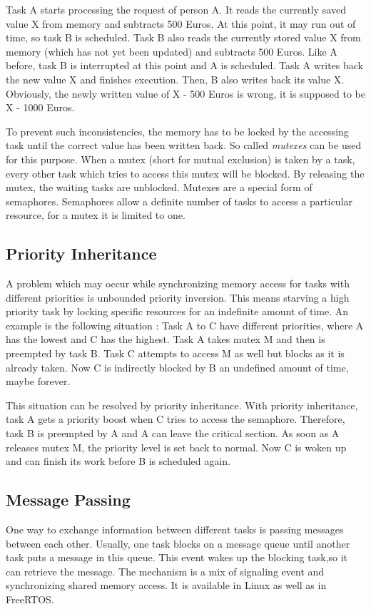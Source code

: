 Task A starts processing the request of person A.
It reads the currently saved value X from memory and subtracts 500 Euros.
At this point, it may run out of time, so task B is scheduled.
Task B also reads the currently stored value X from memory (which has not yet been updated) and subtracts 500 Euros.
Like A before, task B is interrupted at this point and A is scheduled.
Task A writes back the new value X and finishes execution.
Then, B also writes back its value X.
Obviously, the newly written value of X - 500 Euros is wrong, it is supposed to be X - 1000 Euros. 
\par
To prevent such inconsistencies, the memory has to be locked by the accessing task until the correct value has been written back.
So called \textit{mutexes} can be used for this purpose.
When a mutex (short for mutual exclusion) is taken by a task, every other task which tries to access this mutex will be blocked.
By releasing the mutex, the waiting tasks are unblocked.
Mutexes are a special form of semaphores.
Semaphores allow a definite number of tasks to access a particular resource, for a mutex it is limited to one.

\subsection{Priority Inheritance}\label{ss_priority_inheritance}
A problem which may occur while synchronizing memory access for tasks with different priorities is unbounded priority inversion.
This means starving a high priority task by locking specific resources for an indefinite amount of time.
An example is the following situation \cite{rostedt:iotrtp}:
Task A to C have different priorities, where A has the lowest and C has the highest.
Task A takes mutex M and then is preempted by task B.
Task C attempts to access M as well but blocks as it is already taken.
Now C is indirectly blocked by B an undefined amount of time, maybe forever.
\par
This situation can be resolved by priority inheritance.
With priority inheritance, task A gets a priority boost when C tries to access the semaphore.
Therefore, task B is preempted by A and A can leave the critical section.
As soon as A releases mutex M, the priority level is set back to normal.
Now C is woken up and can finish its work before B is scheduled again.

\subsection{Message Passing}
One way to exchange information between different tasks is passing messages between each other. 
Usually, one task blocks on a message queue until another task puts a message in this queue.
This event wakes up the blocking task,so it can retrieve the message.
The mechanism is a mix of signaling event and synchronizing shared memory access.
It is available in Linux as well as in FreeRTOS.

